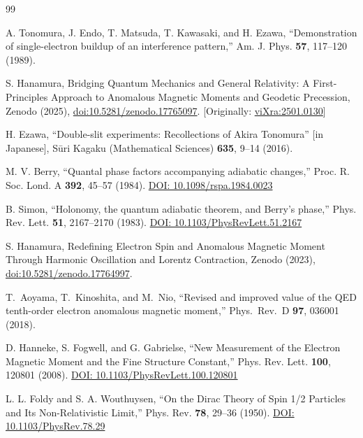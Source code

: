 \documentclass[%
 reprint,
 amsmath,amssymb,
 aps,
 prb,
]{revtex4-2}
\numberwithin{equation}{section}
\begin{document}
\begin{thebibliography}{99}

A. Tonomura, J. Endo, T. Matsuda, T. Kawasaki, and H. Ezawa, ``Demonstration of single-electron buildup of an interference pattern,'' Am. J. Phys. \textbf{57}, 117--120 (1989).

S. Hanamura, Bridging Quantum Mechanics and General Relativity: A First-Principles Approach to Anomalous Magnetic Moments and Geodetic Precession, Zenodo (2025), \href{https://doi.org/10.5281/zenodo.17765097}{doi:10.5281/zenodo.17765097}. [Originally: \href{https://vixra.org/abs/2501.0130}{viXra:2501.0130}]

H. Ezawa, ``Double-slit experiments: Recollections of Akira Tonomura'' [in Japanese], Sūri Kagaku (Mathematical Sciences) \textbf{635}, 9--14 (2016).

M. V. Berry, ``Quantal phase factors accompanying adiabatic changes,''
Proc. R. Soc. Lond. A \textbf{392}, 45--57 (1984).
\href{https://doi.org/10.1098/rspa.1984.0023}{DOI: 10.1098/rspa.1984.0023}

B. Simon, ``Holonomy, the quantum adiabatic theorem, and Berry's phase,''
Phys. Rev. Lett. \textbf{51}, 2167--2170 (1983).
\href{https://doi.org/10.1103/PhysRevLett.51.2167}{DOI: 10.1103/PhysRevLett.51.2167}


S. Hanamura, Redefining Electron Spin and Anomalous Magnetic Moment Through Harmonic Oscillation and Lorentz Contraction, Zenodo (2023), \href{https://doi.org/10.5281/zenodo.17764997}{doi:10.5281/zenodo.17764997}.

T.~Aoyama, T.~Kinoshita, and M.~Nio,
``Revised and improved value of the QED tenth-order electron anomalous magnetic moment,''
Phys.\ Rev.\ D \textbf{97}, 036001 (2018).

D. Hanneke, S. Fogwell, and G. Gabrielse, ``New Measurement of the Electron Magnetic Moment and the Fine Structure Constant,'' Phys. Rev. Lett. \textbf{100}, 120801 (2008). \href{https://doi.org/10.1103/PhysRevLett.100.120801}{DOI: 10.1103/PhysRevLett.100.120801}

L. L. Foldy and S. A. Wouthuysen, ``On the Dirac Theory of Spin 1/2 Particles and Its Non-Relativistic Limit,'' Phys. Rev. \textbf{78}, 29--36 (1950). \href{https://doi.org/10.1103/PhysRev.78.29}{DOI: 10.1103/PhysRev.78.29}


\end{thebibliography}
\end{document}
